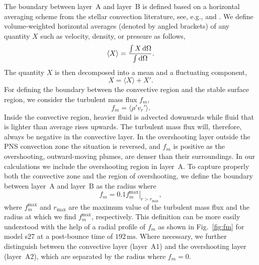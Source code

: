 The boundary between layer~A and layer~B is defined based on a horizontal averaging scheme
from the stellar convection literature, see, e.g., \citet{nordlund_09}
and \cite{viallet_13}. We define volume-weighted horizontal averages
(denoted by angled brackets) of any quantity $X$ such as velocity,
density, or pressure as follows,
\begin{equation}
\langle X \rangle = \frac{\int X \, \mathrm{d} \Omega }{\int \mathrm{d} \Omega}.  
\end{equation}
The quantity $X$ is then decomposed into a mean and a fluctuating component,
\begin{equation}
X = \langle X \rangle + X'.
\end{equation}
For defining the boundary between the convective region and the stable surface region, we consider the turbulent mass flux $f_m$,
\begin{equation} \label{eq:mflux}
f_m = \langle \rho' v_r'\rangle. 
\end{equation}
Inside the convective region, heavier fluid is
advected downwards while fluid that is lighter than average rises
upwards. The turbulent mass flux will, therefore, always be negative
in the convective layer. 
In the overshooting layer outside the PNS convection zone the
situation is reversed, and $f_m$ is positive as
the overshooting, outward-moving plumes, are denser
than their surroundings.  In our calculations we
include the overshooting region in layer~A. To capture
properly both the convective zone and the region of overshooting, we
define the boundary between layer~A and
layer~B as the radius where
\begin{equation} 
 f_m  = \left.  0.1 f_m^\mathrm{max}\right  |_{r>r_\mathrm{max}},
\end{equation} 
where
$f_m^\mathrm{max}$ and $r_\mathrm{max}$ are the maximum value of the turbulent mass flux and the radius at which we find $f_m^\mathrm{max}$, respectively.   
This definition can be more easily understood with the help of a radial profile of $f_m$ as shown in Fig.~\ref{fig:fm} for model s27 at a post-bounce time of 
$192 \, \mathrm{ms}$. Where necessary, we further distinguish between the convective layer
(layer~A1) and the overshooting layer (layer~A2), which are separated
by the radius where $f_m=0$.

